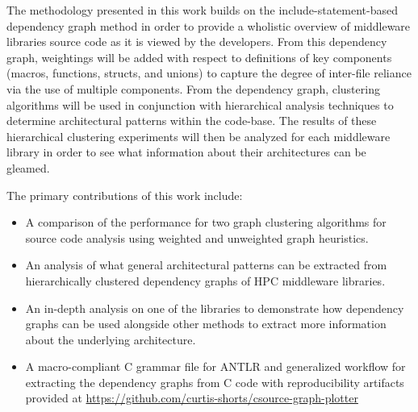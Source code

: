 The methodology presented in this work builds on the include-statement-based dependency graph method in order to provide a wholistic overview of middleware libraries source code as it is viewed by the developers. From this dependency graph, weightings will be added with respect to definitions of key components (macros, functions, structs, and unions) to capture the degree of inter-file reliance via the use of multiple components. From the dependency graph, clustering algorithms will be used in conjunction with hierarchical analysis techniques to determine architectural patterns within the code-base. The results of these hierarchical clustering experiments will then be analyzed for each middleware library in order to see what information about their architectures can be gleamed.

The primary contributions of this work include:
\begin{itemize}
    \item A comparison of the performance for two graph clustering algorithms for source code analysis using weighted and unweighted graph heuristics.
    \item An analysis of what general architectural patterns can be extracted from hierarchically clustered dependency graphs of HPC middleware libraries.
    \item An in-depth analysis on one of the libraries to demonstrate how dependency graphs can be used alongside other methods to extract more information about the underlying architecture.
    \item A macro-compliant C grammar file for ANTLR and generalized workflow for extracting the dependency graphs from C code with reproducibility artifacts provided at \url{https://github.com/curtis-shorts/csource-graph-plotter}
\end{itemize}

